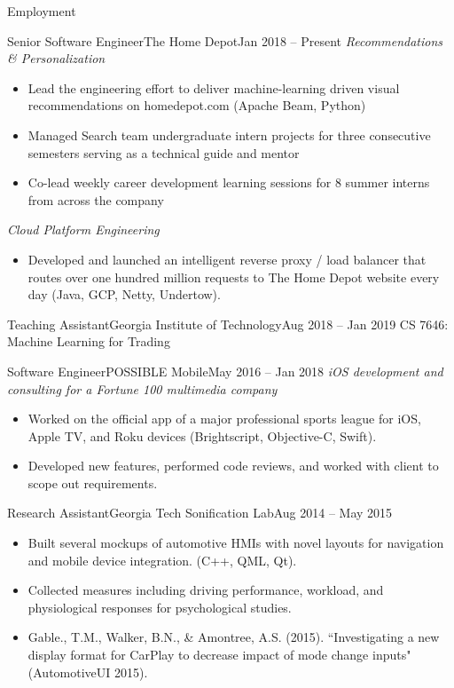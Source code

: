 \documentclass[]{mcdowellcv}
\begin{document}
	\begin{cvsection}{Employment}
		\begin{cvsubsection}{Senior Software Engineer}{The Home Depot}{Jan 2018 -- Present}
			\textit{Recommendations \& Personalization}
			\begin{itemize}
				\item Lead the engineering effort to deliver machine-learning driven visual recommendations on homedepot.com (Apache Beam, Python)
				\item Managed Search team undergraduate intern projects for three consecutive semesters serving as a technical guide and mentor
				\item Co-lead weekly career development learning sessions for 8 summer interns from across the company
			\end{itemize}
			\textit{Cloud Platform Engineering}
			\begin{itemize}
				\item Developed and launched an intelligent reverse proxy / load balancer that routes over one hundred million requests to The Home Depot website every day (Java, GCP, Netty, Undertow).
			\end{itemize}
		\end{cvsubsection}

		\begin{cvsubsection}{Teaching Assistant}{Georgia Institute of Technology}{Aug 2018 -- Jan 2019}
			CS 7646: Machine Learning for Trading
		\end{cvsubsection}
		
		\begin{cvsubsection}{Software Engineer}{POSSIBLE Mobile}{May 2016 -- Jan 2018}	
			\textit{iOS development and consulting for a Fortune 100 multimedia company}
			\begin{itemize}
				\item Worked on the official app of a major professional sports league for iOS, Apple TV, and Roku devices (Brightscript, Objective-C, Swift).
				\item Developed new features, performed code reviews, and worked with client to scope out requirements.
			\end{itemize}
		\end{cvsubsection}
		
		\begin{cvsubsection}{Research Assistant}{Georgia Tech Sonification Lab}{Aug 2014 -- May 2015}		
			\begin{itemize}
				\item Built several mockups of automotive HMIs with novel layouts for navigation and mobile device integration. (C++, QML, Qt).
				\item Collected measures including driving performance, workload, and physiological responses for psychological studies.
				\item Gable., T.M., Walker, B.N., \& Amontree, A.S. (2015). ``Investigating a new display format for CarPlay to decrease impact of mode change inputs" (AutomotiveUI 2015).
			\end{itemize}
		\end{cvsubsection}
		

\end{cvsection}
\end{document}
